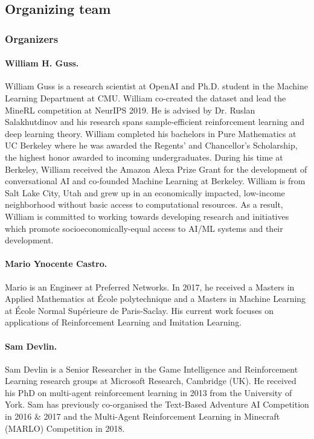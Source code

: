 \subsection{Organizing team}

\subsubsection{Organizers}

\paragraph{William H. Guss.} William Guss is a research scientist at OpenAI and Ph.D. student in the Machine Learning Department at CMU. William co-created the \minenet{} dataset and lead the MineRL  competition at NeurIPS 2019. He is advised by Dr. Ruslan Salakhutdinov
and his research spans sample-efficient reinforcement learning and deep learning theory.  William completed his bachelors in Pure Mathematics at UC Berkeley where he was awarded the Regents' and Chancellor's Scholarship, the highest honor awarded to incoming undergraduates. During his time at Berkeley, William received the Amazon Alexa Prize Grant for the development of conversational AI and co-founded Machine Learning at Berkeley. William is from Salt Lake City, Utah and grew up in an economically impacted, low-income neighborhood without basic access to computational resources. As a result, William is committed to working towards developing research and initiatives which promote socioeconomically-equal access to AI/ML systems and their development.

\paragraph{Mario Ynocente Castro.} Mario is an Engineer at Preferred Networks. In 2017, he received a Masters in Applied Mathematics at École polytechnique and a Masters in Machine Learning at École Normal Supérieure de Paris-Saclay. His current work focuses on applications of Reinforcement Learning and Imitation Learning.

\paragraph{Sam Devlin.} Sam Devlin is a Senior Researcher in the Game Intelligence and Reinforcement Learning research groups at Microsoft Research, Cambridge (UK). He received his PhD on multi-agent reinforcement learning in 2013 from the University of York. Sam has previously co-organised the Text-Based Adventure AI Competition in 2016 \& 2017 and the Multi-Agent Reinforcement Learning in Minecraft (MARLO) Competition in 2018.

